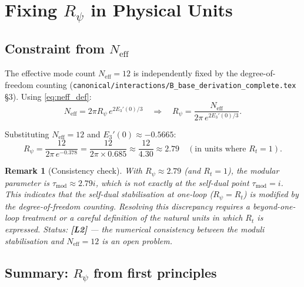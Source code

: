 \documentclass[11pt,a4paper]{article}
\newtheorem{remark}{Remark}
\newcommand{\Ltwo}{\textbf{[L2]}}
\begin{document}
\section{Fixing \texorpdfstring{$R_\psi$}{Rpsi} in Physical Units}
\label{sec:physical}

\subsection{Constraint from $N_{\mathrm{eff}}$}

The effective mode count $N_{\mathrm{eff}} = 12$ is independently fixed by
the degree-of-freedom counting
(\texttt{canonical/interactions/B\_base\_derivation\_complete.tex} §3).
Using \eqref{eq:neff_def}:
\begin{equation}
\label{eq:rpsi_neff}
  N_{\mathrm{eff}} = 2\pi R_\psi\,e^{2E_3'(0)/3}
  \quad\Rightarrow\quad
  R_\psi = \frac{N_{\mathrm{eff}}}{2\pi\,e^{2E_3'(0)/3}}.
\end{equation}

Substituting $N_{\mathrm{eff}}=12$ and $E_3'(0)\approx -0.5665$:
\begin{equation}
\label{eq:rpsi_numerical}
  R_\psi
  = \frac{12}{2\pi\,e^{-0.378}}
  = \frac{12}{2\pi\times 0.685}
  \approx \frac{12}{4.30}
  \approx 2.79
  \quad(\text{in units where }R_t=1).
\end{equation}

\begin{remark}[Consistency check]
  With $R_\psi\approx 2.79$ (and $R_t=1$), the modular parameter is
  $\tau_{\mathrm{mod}}\approx 2.79i$, which is not exactly at the self-dual
  point $\tau_{\mathrm{mod}}=i$.
  This indicates that the self-dual stabilisation at one-loop ($R_\psi=R_t$)
  is modified by the degree-of-freedom counting.
  Resolving this discrepancy requires a beyond-one-loop treatment or a
  careful definition of the natural units in which $R_t$ is expressed.
  Status: \Ltwo{} — the numerical consistency between the moduli stabilisation
  and $N_{\mathrm{eff}}=12$ is an open problem.
\end{remark}

\subsection{Summary: $R_\psi$ from first principles}
\end{document}
